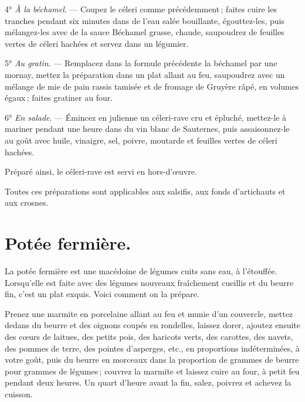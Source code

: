 4° \textit{À la béchamel}. — Coupez le céleri comme précédemment ; faites cuire
les tranches pendant six minutes dans de l’eau salée bouillante, égouttez-les,
puis mélangez-les avec de la sauce Béchamel grasse, chaude, saupoudrez de
feuilles vertes de céleri hachées et servez dans un légumier.

\medskip

5° \textit{Au gratin}. — Remplacez dans la formule précédente la béchamel par
une mornay, mettez la préparation dans un plat allant au feu, saupoudrez avec
un mélange de mie de pain rassis tamisée et de fromage de Gruyère râpé, en
volumes égaux ; faites gratiner au four.

\medskip

6° \textit{En salade}. — Émincez en julienne un céleri-rave cru et épluché,
mettez-le à mariner pendant une heure dans du vin blanc de Sauternes, puis
assaisonnez-le au goût avec huile, vinaigre, sel, poivre, moutarde et feuilles
vertes de céleri hachées.

Préparé ainsi, le céleri-rave est servi en hors-d'œuvre.

\sk

Toutes ces préparations sont applicables aux salsifis, aux fonds d'artichauts et
aux crosnes.

\section*{\centering Potée fermière.}
{}
\label{pg0772} \hypertarget{p0772}{}

La potée fermière est une macédoine de légumes cuits sans eau, à l'étouffée.
Lorsqu'elle est faite avec des légumes nouveaux fraîchement cueillis et du
beurre fin, c'est un plat exquis. Voici comment on la prépare.

Prenez une marmite en porcelaine allant au feu et munie d'un couvercle, mettez
dedans du beurre et des oignons coupés en rondelles, laissez dorer, ajoutez
ensuite des cœurs de laitues, des petits pois, des haricots verts, des
carottes, des navets, des pommes de terre, des pointes d'asperges, etc., en
proportions indéterminées, à votre goût, puis du beurre en morceaux dans la
proportion de {\mmm} grammes de beurre pour {\mmm} grammes de
légumes ; couvrez la marmite et laissez cuire au four, à petit feu pendant deux
heures. Un quart d'heure avant la fin, salez, poivrez et achevez la cuisson.

